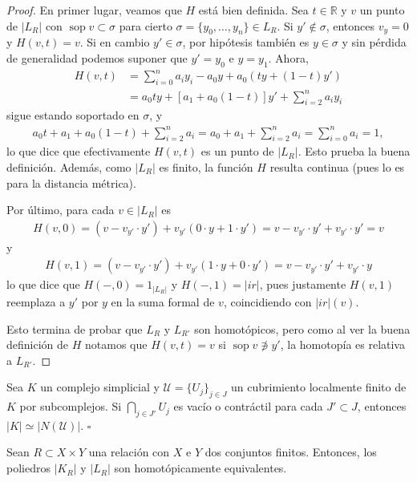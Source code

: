 \documentclass[11pt]{article}
\newcommand{\R}{\mathbb{R}}
\newcommand{\paint}[1]{\color{color}{#1}}
\newenvironment{lemma}[2][Lema]{\begin{trivlist}
\item[\hskip \labelsep \paint{{\bfseries #1}}\hskip \labelsep {\bfseries #2.}]}{\end{trivlist}}
\newenvironment{exercise}[2][Ejercicio]{\begin{trivlist}
\item[\hskip \labelsep \paint{{\bfseries #1}}\hskip \labelsep {\bfseries #2.}]}{\end{trivlist}}
\begin{document}
\begin{proof}
En primer lugar, veamos que $H$ est\'a bien definida. Sea $t \in \R$ y $v$ un punto de $|L_R|$ con $\operatorname{sop} v \subset \sigma$ para cierto $ \sigma = \{y_0, \dots, y_n\} \in L_R$.
Si $y' \not \in \sigma$, entonces $v_y = 0$ y $H(v,t) = v$. Si en cambio $y' \in \sigma$, por hip\'otesis tambi\'en es $y \in \sigma$ y sin p\'erdida de generalidad podemos suponer que $y' = y_0$ e $y = y_1$. Ahora, 
\begin{align*}
H(v,t) &= \sum_{i=0}^na_iy_i - a_0y + a_0(ty + (1-t)y') \\
& = a_0ty + [a_1 + a_0(1-t)]y' + \sum_{i=2}^na_iy_i
\end{align*}
sigue estando soportado en $\sigma$, y 
\begin{align*}
a_0t + a_1 + a_0(1-t) + \sum_{i=2}^na_i = a_0 + a_1 + \sum_{i=2}^na_i = \sum_{i=0}^na_i = 1,
\end{align*}
lo que dice que efectivamente $H(v,t)$ es un punto de $|L_R|$. Esto prueba la buena definici\'on. Adem\'as, como $|L_R|$ es finito, la funci\'on $H$ resulta continua (pues lo es para la distancia m\'etrica). 

Por \'ultimo, para cada $v \in |L_R|$ es
\begin{align*}
H(v,0) = (v - v_{y'} \cdot y') + v_{y'}(0 \cdot y + 1 \cdot y') = v - v_{y'} \cdot y' + v_{y'} \cdot y' = v
\end{align*}
y
\begin{align*}
H(v,1) = (v - v_{y'} \cdot y') + v_{y'}(1 \cdot y + 0\cdot y') = v - v_{y'} \cdot y' + v_{y'} \cdot y 
\end{align*}
lo que dice que $H(-,0) = 1_{|L_R|}$ y $H(-,1) = |ir|$, pues justamente $H(v,1)$ reemplaza a $y'$ por $y$ en la suma formal de $v$, coincidiendo con $|ir|(v)$.

Esto termina de probar que $L_R$ y $L_{R'}$ son homot\'opicos, pero como al ver la buena definici\'on de $H$ notamos que $H(v,t) = v$ si $\operatorname{sop} v \not \ni y'$, la homotop\'ia es relativa a $L_{R'}$. 
\end{proof}
\vspace{25pt}
\begin{lemma}{del Nervio} Sea $K$ un complejo simplicial y $\mathcal{U} = \{U_j\}_{j \in J}$ un cubrimiento localmente finito de $K$ por subcomplejos. Si $\bigcap_{j \in J'}U_j$ es vac\'io o contr\'actil para cada $J' \subset J$, entonces $|K| \simeq |N(\mathcal{U})|$. $\square $
\end{lemma}
\newpage
\begin{exercise}{(sobre poliedros y relaciones, en el caso finito)} Sean $R \subset X \times Y$ una relaci\'on con $X$ e $Y$ dos conjuntos finitos. Entonces, los poliedros $|K_R|$ y $|L_R|$ son homot\'opicamente equivalentes.
\end{exercise}
\end{document}
